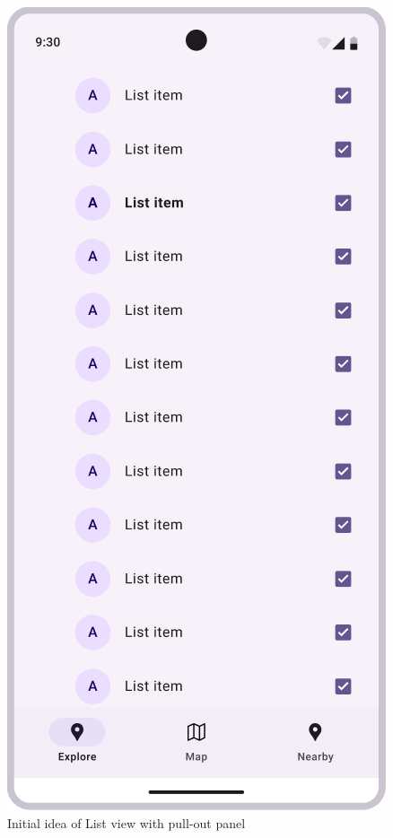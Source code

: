 \begin{figure}[H]
\begin{minipage}{0.26\textwidth}
        \caption{Initial idea of List view with pull-out panel}
    \end{minipage}
    \hspace{0.3cm}
    \begin{minipage}{0.26\textwidth}
        \centering
        \includegraphics[width=\textwidth]{images/paul/wireframes/listScreenv2.png}

\end{minipage}
\end{figure}
